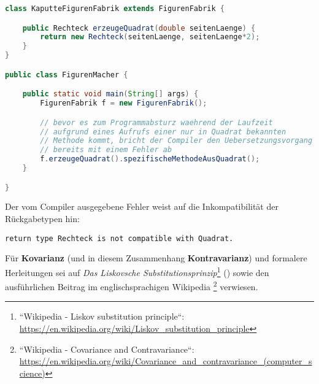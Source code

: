 \begin{lstlisting}[language=java]
class KaputteFigurenFabrik extends FigurenFabrik {

    public Rechteck erzeugeQuadrat(double seitenLaenge) {
        return new Rechteck(seitenLaenge, seitenLaenge*2);
    }
}

public class FigurenMacher {

    public static void main(String[] args) {
        FigurenFabrik f = new FigurenFabrik();

        // bevor es zum Programmabsturz waehrend der Laufzeit
        // aufgrund eines Aufrufs einer nur in Quadrat bekannten
        // Methode kommt, bricht der Compiler den Uebersetzungsvorgang
        // bereits mit einem Fehler ab
        f.erzeugeQuadrat().spezifischeMethodeAusQuadrat();
    }

}
\end{lstlisting}

Der vom Compiler ausgegebene Fehler weist auf die Inkompatibilität der Rückgabetypen hin:

\begin{lstlisting}[language=text]
return type Rechteck is not compatible with Quadrat.
\end{lstlisting}

Für \textbf{Kovarianz} (und in diesem Zusammenhang \textbf{Kontravarianz}) und formalere Herleitungen sei auf
\textit{Das Liskovsche Substitutionsprinzip}\footnote{``Wikipedia - Liskov substitution principle``: \url{https://en.wikipedia.org/wiki/Liskov_substitution_principle}} (\cite{Lis87})
sowie den ausführlichen Beitrag im englischsprachigen Wikipedia \footnote{
    ``Wikipedia - Covariance and Contravariance``: \url{https://en.wikipedia.org/wiki/Covariance_and_contravariance_(computer_science)}
} verwiesen.
